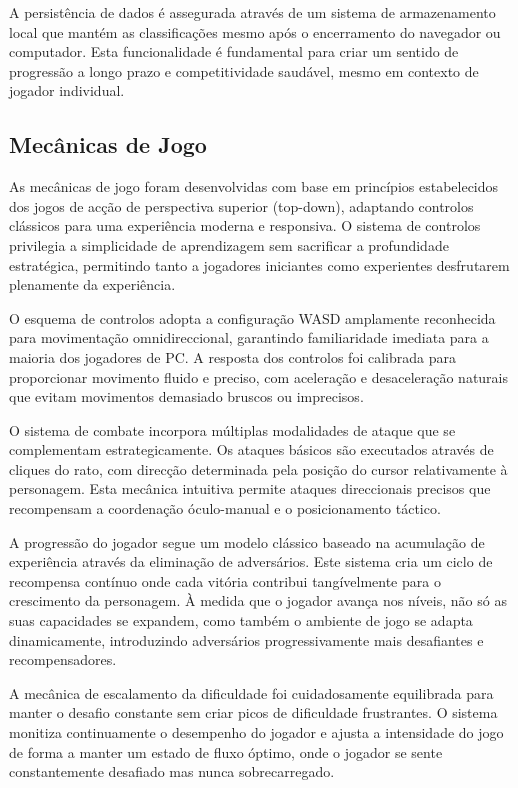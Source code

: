 \hspace{2em} A persistência de dados é assegurada através de um sistema de armazenamento local que mantém as classificações mesmo após o encerramento do navegador ou computador. Esta funcionalidade é fundamental para criar um sentido de progressão a longo prazo e competitividade saudável, mesmo em contexto de jogador individual.

\newpage
\subsection{Mecânicas de Jogo}
\hspace{2em} As mecânicas de jogo foram desenvolvidas com base em princípios estabelecidos dos jogos de acção de perspectiva superior (top-down), adaptando controlos clássicos para uma experiência moderna e responsiva. O sistema de controlos privilegia a simplicidade de aprendizagem sem sacrificar a profundidade estratégica, permitindo tanto a jogadores iniciantes como experientes desfrutarem plenamente da experiência.

\hspace{2em} O esquema de controlos adopta a configuração WASD amplamente reconhecida para movimentação omnidireccional, garantindo familiaridade imediata para a maioria dos jogadores de PC. A resposta dos controlos foi calibrada para proporcionar movimento fluido e preciso, com aceleração e desaceleração naturais que evitam movimentos demasiado bruscos ou imprecisos.

\hspace{2em} O sistema de combate incorpora múltiplas modalidades de ataque que se complementam estrategicamente. Os ataques básicos são executados através de cliques do rato, com direcção determinada pela posição do cursor relativamente à personagem. Esta mecânica intuitiva permite ataques direccionais precisos que recompensam a coordenação óculo-manual e o posicionamento táctico.

\hspace{2em} A progressão do jogador segue um modelo clássico baseado na acumulação de experiência através da eliminação de adversários. Este sistema cria um ciclo de recompensa contínuo onde cada vitória contribui tangívelmente para o crescimento da personagem. À medida que o jogador avança nos níveis, não só as suas capacidades se expandem, como também o ambiente de jogo se adapta dinamicamente, introduzindo adversários progressivamente mais desafiantes e recompensadores.

\hspace{2em} A mecânica de escalamento da dificuldade foi cuidadosamente equilibrada para manter o desafio constante sem criar picos de dificuldade frustrantes. O sistema monitiza continuamente o desempenho do jogador e ajusta a intensidade do jogo de forma a manter um estado de fluxo óptimo, onde o jogador se sente constantemente desafiado mas nunca sobrecarregado.

